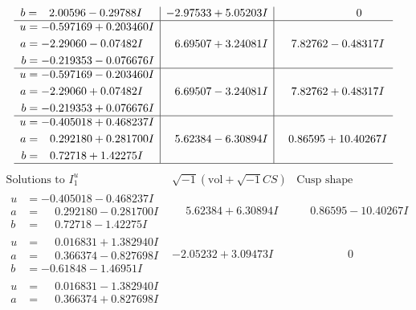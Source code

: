 \documentclass[1p]{elsarticle_modified}
\theoremstyle{definition}
\newcommand{\I}{\sqrt{-1}}
\begin{document}
$$\begin{array}{c|c|c}
\begin{aligned}
b &= \phantom{-}2.00596 - 0.29788 I\end{aligned}
 & -2.97533 + 5.05203 I & \phantom{-0.000000 } 0 \\ \hline\begin{aligned}
u &= -0.597169 + 0.203460 I \\
a &= -2.29060 - 0.07482 I \\
b &= -0.219353 - 0.076676 I\end{aligned}
 & \phantom{-}6.69507 + 3.24081 I & \phantom{-}7.82762 - 0.48317 I \\ \hline\begin{aligned}
u &= -0.597169 - 0.203460 I \\
a &= -2.29060 + 0.07482 I \\
b &= -0.219353 + 0.076676 I\end{aligned}
 & \phantom{-}6.69507 - 3.24081 I & \phantom{-}7.82762 + 0.48317 I \\ \hline\begin{aligned}
u &= -0.405018 + 0.468237 I \\
a &= \phantom{-}0.292180 + 0.281700 I \\
b &= \phantom{-}0.72718 + 1.42275 I\end{aligned}
 & \phantom{-}5.62384 - 6.30894 I & \phantom{-}0.86595 + 10.40267 I\\
 \hline 
 \end{array}$$\newpage$$\begin{array}{c|c|c}  
\text{Solutions to }I^u_{1}& \I (\text{vol} + \sqrt{-1}CS) & \text{Cusp shape}\\
 \hline 
\begin{aligned}
u &= -0.405018 - 0.468237 I \\
a &= \phantom{-}0.292180 - 0.281700 I \\
b &= \phantom{-}0.72718 - 1.42275 I\end{aligned}
 & \phantom{-}5.62384 + 6.30894 I & \phantom{-}0.86595 - 10.40267 I \\ \hline\begin{aligned}
u &= \phantom{-}0.016831 + 1.382940 I \\
a &= \phantom{-}0.366374 - 0.827698 I \\
b &= -0.61848 - 1.46951 I\end{aligned}
 & -2.05232 + 3.09473 I & \phantom{-0.000000 } 0 \\ \hline\begin{aligned}
u &= \phantom{-}0.016831 - 1.382940 I \\
a &= \phantom{-}0.366374 + 0.827698 I \\

\end{aligned}
\end{array}$$
\end{document}
